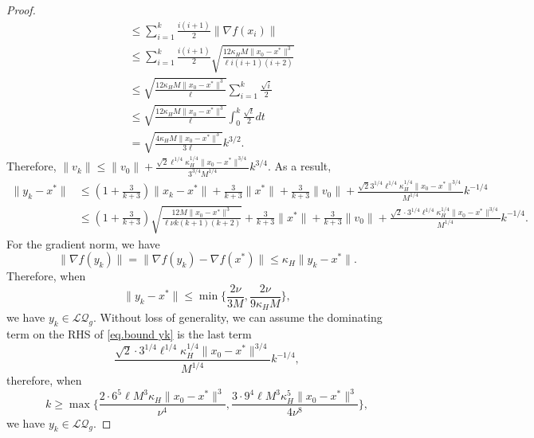 \documentclass{article}
\begin{document}
\begin{proof}
\begin{equation*}
\begin{aligned}
            &\leq \sum_{i=1}^k \frac{i(i+1)}{2}\|\nabla f(x_i)\|\\
            &\leq \sum_{i=1}^k\frac{i(i+1)}{2}\sqrt{\frac{12\kappa_H M\|x_0-x^*\|^3}{\ell i(i+1)(i+2)}}\\
            &\leq \sqrt{\frac{12\kappa_H M\|x_0-x^*\|^3}{\ell}}\sum_{i=1}^k\frac{\sqrt{i}}{2}\\
            &\leq \sqrt{\frac{12\kappa_H M\|x_0-x^*\|^3}{\ell}}\int_0^k \frac{\sqrt{t}}{2}dt\\
            &=\sqrt{\frac{4\kappa_H M\|x_0-x^*\|^3}{3\ell}}k^{3/2}.
        \end{aligned}
    \end{equation*}
    Therefore, $\|v_k\|\leq \|v_0\|+\frac{\sqrt{2}\ell^{1/4}\kappa_H^{1/4}\|x_0-x^*\|^{3/4}}{3^{3/4}M^{1/4}}k^{3/4}$. As a result,
    \begin{equation}
    \label{eq.bound yk}
    \begin{aligned}
        \|y_k-x^*\|&\leq (1+\frac{3}{k+3})\|x_k-x^*\|+\frac{3}{k+3}\|x^*\|+\frac{3}{k+3}\|v_0\|+\frac{\sqrt{2}3^{1/4}\ell^{1/4}\kappa_H^{1/4}\|x_0-x^*\|^{3/4}}{M^{1/4}}k^{-1/4}\\
        &\leq (1+\frac{3}{k+3})\sqrt{\frac{12M\|x_0-x^*\|^3}{\ell\nu k(k+1)(k+2)}}+\frac{3}{k+3}\|x^*\|+\frac{3}{k+3}\|v_0\|+\frac{\sqrt{2}\cdot3^{1/4}\ell^{1/4}\kappa_H^{1/4}\|x_0-x^*\|^{3/4}}{M^{1/4}}k^{-1/4}.
    \end{aligned}
    \end{equation}
    For the gradient norm, we have
    \begin{equation*}
        \|\nabla f(y_k)\| = \|\nabla f(y_k)-\nabla f(x^*)\|\leq \kappa_H\|y_k-x^*\|.
    \end{equation*}
    Therefore, when 
    \begin{equation}\label{eq.quadratic region guarantee}
    \|y_k-x^*\|\leq \min\{\frac{2\nu}{3M},\frac{2\nu}{9\kappa_HM}\},
    \end{equation}
    we have $y_k\in\mathcal{LQ}_g$. Without loss of generality, we can assume the dominating term on the RHS of \eqref{eq.bound yk} is the last term
    \begin{equation*}
        \frac{\sqrt{2}\cdot3^{1/4}\ell^{1/4}\kappa_H^{1/4}\|x_0-x^*\|^{3/4}}{M^{1/4}}k^{-1/4},
    \end{equation*}
    therefore, when
    \begin{equation*}
        k\geq \max\{\frac{2\cdot6^5\ell M^3\kappa_H\|x_0-x^*\|^3}{\nu^4},\frac{3\cdot9^4\ell M^3\kappa_H^5\|x_0-x^*\|^3}{4\nu^8}\},
    \end{equation*}
    we have $y_k\in\mathcal{LQ}_g$.
\end{proof}
\end{document}
